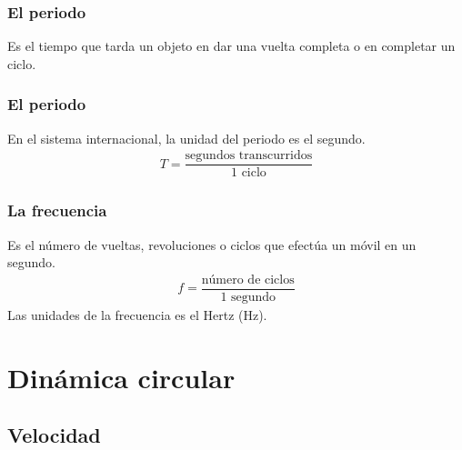 \documentclass[14pt]{beamer}
\begin{document}
\begin{frame}
\frametitle{El periodo}
Es el tiempo que tarda un objeto en dar una vuelta completa o en completar un ciclo.
\end{frame}
\begin{frame}
\frametitle{El periodo}
En el sistema internacional, la unidad del periodo es el segundo.
\pause
\begin{align*}
T = \dfrac{\text{segundos transcurridos}}{\text{1 ciclo}}
\end{align*}
\end{frame}
\begin{frame}
\frametitle{La frecuencia}
Es el número de vueltas, revoluciones o ciclos que efectúa un móvil en un segundo.
\pause
\begin{align*}
f = \dfrac{\text{número de ciclos}}{\text{1 segundo}}
\end{align*}
Las unidades de la frecuencia es el Hertz (\si{\hertz}).
\end{frame}

\section{Dinámica circular}
\subsection{Velocidad}
\end{document}
